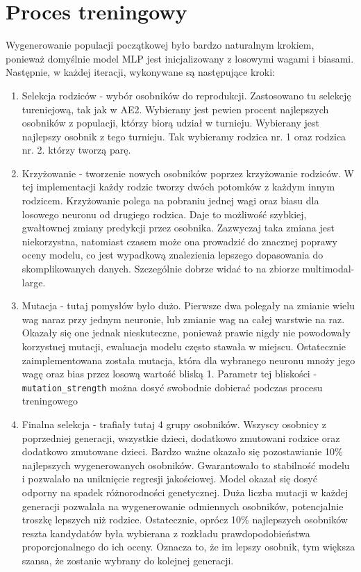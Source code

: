 \documentclass{article}
\begin{document}
\section*{Proces treningowy}
Wygenerowanie populacji początkowej było bardzo naturalnym krokiem, ponieważ domyślnie model MLP jest inicjalizowany z losowymi wagami i biasami. Następnie, w każdej iteracji, wykonywane są następujące kroki:
\begin{enumerate}
    \item Selekcja rodziców - wybór osobników do reprodukcji. Zastosowano tu selekcję tureniejową, tak jak w AE2. Wybierany jest pewien procent najlepszych osobników z populacji, którzy biorą udział w turnieju. Wybierany jest najlepszy osobnik z tego turnieju. Tak wybieramy rodzica nr. 1 oraz rodzica nr. 2. którzy tworzą parę.
    \item Krzyżowanie - tworzenie nowych osobników poprzez krzyżowanie rodziców. W tej implementacji każdy rodzic tworzy dwóch potomków z każdym innym rodzicem. Krzyżowanie polega na pobraniu jednej wagi oraz biasu dla losowego neuronu od drugiego rodzica. Daje to możliwość szybkiej, gwałtownej zmiany predykcji przez osobnika. Zazwyczaj taka zmiana jest niekorzystna, natomiast czasem może ona prowadzić do znacznej poprawy oceny modelu, co jest wypadkową znalezienia lepszego dopasowania do skomplikowanych danych. Szczególnie dobrze widać to na zbiorze multimodal-large.
    \item Mutacja - tutaj pomysłów było dużo. Pierwsze dwa polegały na zmianie wielu wag naraz przy jednym neuronie, lub zmianie wag na całej warstwie na raz. Okazały się one jednak nieskuteczne, ponieważ prawie nigdy nie powodowały korzystnej mutacji, ewaluacja modelu często stawała w miejscu. Ostatecznie zaimplementowana została mutacja, która dla wybranego neuronu mnoży jego wagę oraz bias przez losową wartość bliską 1. Parametr tej bliskości - \texttt{mutation\_strength} można dosyć swobodnie dobierać podczas procesu treningowego
    \item Finalna selekcja - trafiały tutaj 4 grupy osobników. Wszyscy osobnicy z poprzedniej generacji, wszystkie dzieci, dodatkowo zmutowani rodzice oraz dodatkowo zmutowane dzieci. Bardzo ważne okazało się pozostawianie 10\% najlepszych wygenerowanych osobników. Gwarantowało to stabilność modelu i pozwalało na uniknięcie regresji jakościowej. Model okazał się dosyć odporny na spadek różnorodności genetycznej. Duża liczba mutacji w każdej generacji pozwalała na wygenerowanie odmiennych osobników, potencjalnie troszkę lepszych niż rodzice. Ostatecznie, oprócz 10\% najlepszych osobników reszta kandydatów była wybierana z rozkładu prawdopodobieństwa proporcjonalnego do ich oceny. Oznacza to, że im lepszy osobnik, tym większa szansa, że zostanie wybrany do kolejnej generacji.
\end{enumerate}
\end{document}
